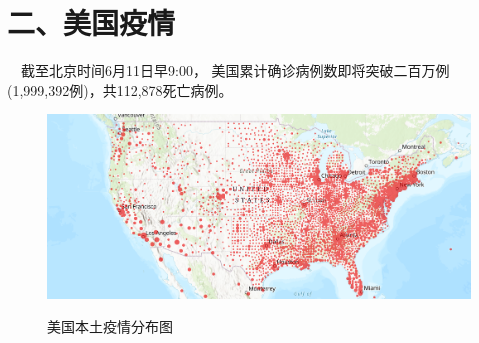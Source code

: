 \documentclass[
]{article}
\begin{document}
\newpage

\hypertarget{section-3}{%
\section{\texorpdfstring{\textcolor{glaucous}{二、美国疫情}}{}}\label{section-3}}

\vspace{-5mm}

\(\quad\)截至北京时间6月11日早9:00，
美国累计确诊病例数即将突破二百万例(1,999,392例)，共112,878死亡病例。

\begin{figure}[H] 
\caption{美国本土疫情分布图} %
\centering
\includegraphics[]{./input/covid4.png} %
\label{} %
\end{figure}
\end{document}
